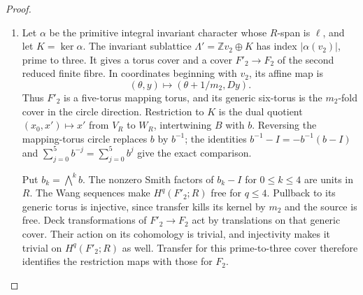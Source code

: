 \documentclass[11pt,a4paper]{article}
\numberwithin{equation}{section}
\theoremstyle{definition}
\begin{document}
\begin{proof}
\begin{enumerate}[label=\arabic*.]
The base-orbifold quotient in \cref{maps:src:F.2.7} shows that
$\gcd(m_1,m_2)=1$.  In particular $m_1$ is a unit in $R$.
The homology augmentation matrix $[A^t-I\mid B^t-I]$ has first
row zero and rank-five minors $-4$ and $-1$ in its last five
rows, respectively.  Its coinvariant quotient over $R$ is
therefore $R$ through $\ell(x)=x_0$.  With $a_i=\ell(v_i)$,
the finite power relations and cusp clutch give the quotient
relation matrix
\[
 \begin{pmatrix}m_1&0&-a_1\\0&m_2&-a_2\\1&1&-\delta\end{pmatrix}.
\]
Here $\delta$ is the character value of the cusp clutch.
The character annihilates the collapsed angular cycles, so these
maps on the finite caps and cusp agree on the boundary and define
a quotient of the abelianized fundamental group.  Simple
connectivity makes its determinant a unit.  Reduction modulo
three forces $a_2$ to be a unit.  Arbitrary clutch translations
are included in $\delta$.

\item Let $\alpha$ be the primitive integral invariant character
whose $R$-span is $\ell$, and let $K=\ker\alpha$.  The invariant
sublattice $\Lambda'=\mathbb Zv_2\oplus K$ has index
$|\alpha(v_2)|$, prime to three.  It gives a torus cover
and a cover $F'_2\to F_2$ of the second reduced finite
fibre.  In coordinates beginning with $v_2$, its affine map is
\[
 (\theta,y)\longmapsto(\theta+1/m_2,Dy).
\]
Thus $F'_2$ is a five-torus mapping torus, and its generic
six-torus is the $m_2$-fold cover in the circle direction.
Restriction to $K$ is the dual quotient
$(x_0,x')\mapsto x'$ from $V_R$ to $W_R$, intertwining $B$ with $b$.
Reversing the mapping-torus circle replaces $b$ by $b^{-1}$;
the identities $b^{-1}-I=-b^{-1}(b-I)$ and
$\sum_{j=0}^5b^{-j}=\sum_{j=0}^5b^j$ give the exact comparison.

Put $b_k=\bigwedge^kb$.  The nonzero Smith factors of $b_k-I$
for $0\leq k\leq4$ are units in $R$.  The Wang sequences make
$H^q(F'_2;R)$ free for $q\leq4$.  Pullback to its generic torus
is injective, since transfer kills its kernel by $m_2$ and the
source is free.  Deck transformations of $F'_2\to F_2$ act by
translations on that generic cover.  Their action on its
cohomology is trivial, and injectivity makes it trivial on
$H^q(F'_2;R)$ as well.  Transfer for this prime-to-three cover
therefore identifies the restriction maps with those for $F_2$.


\end{enumerate}
\end{proof}
\end{document}
